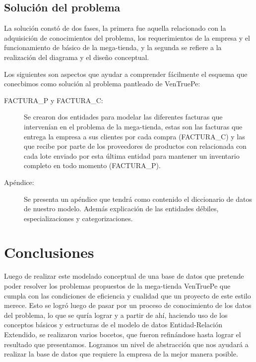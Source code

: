 \documentclass{article}
\begin{document}
\subsection{Soluci\'on del problema}

La soluci\'on const\'o de dos fases, la primera fue aquella relacionado con la adquisici\'on de conocimientos del problema, los requerimientos de la empresa y el funcionamiento de b\'asico de la mega-tienda, y la segunda se refiere a la realizaci\'on del diagrama y el dise\~no conceptual.

Los siguientes son aspectos que ayudar a comprender f\'acilmente el esquema que conecbimos como soluci\'on al problema pantleado de VenTruePe:


\begin{description}
\item[FACTURA\_P y FACTURA\_C:]
Se crearon dos entidades para modelar las diferentes facturas que interven\'ian en el problema de la mega-tienda, estas son las facturas que entrega la empresa a sus clientes por cada compra (FACTURA\_C) y las que recibe por parte de los proveedores de productos con relacionada con cada lote enviado por esta \'ultima entidad para mantener un inventario completo en todo momento (FACTURA\_P). \\

\item[Ap\'endice:]
Se presenta un ap\'endice que tendr\'a como contenido el diccionario de datos de nuestro modelo. Adem\'as explicaci\'on de las entidades d\'ebiles, especializaciones y categorizaciones.
\end{description} 
 

\section{Conclusiones}

Luego de realizar este modelado conceptual de una base de datos que pretende poder resolver los problemas propuestos de la mega-tienda VenTruePe que cumpla con las condiciones de eficiencia y cualidad que un proyecto de este estilo merece. Esto se logr\'o luego de pasar por un proceso de conocimiento de los datos del problema, lo que se qur\'ia lograr y a partir de ah\'i, haciendo uso de los conceptos b\'asicos y estructuras de el modelo de datos Entidad-Relaci\'on Extendido, se realizaron varios bocetos, que fueron refin\'andose hasta lograr el resultado que presentamos. Logramos un nivel de abstracci\'on que nos ayudar\'a a realizar la base de datos que requiere la empresa de la mejor manera posible.
\end{document}
